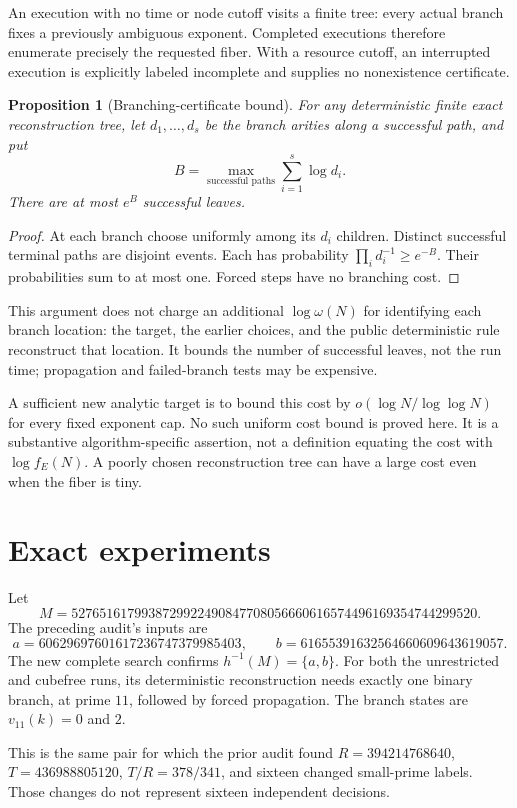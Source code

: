 \documentclass[11pt]{article}
\newtheorem{proposition}[theorem]{Proposition}
\begin{document}
An execution with no time or node cutoff visits a finite tree: every actual branch fixes a previously ambiguous exponent. Completed executions therefore enumerate precisely the requested fiber. With a resource cutoff, an interrupted execution is explicitly labeled incomplete and supplies no nonexistence certificate.

\begin{proposition}[Branching-certificate bound]\label{prop:cost}
For any deterministic finite exact reconstruction tree, let $d_1,\ldots,d_s$ be the branch arities along a successful path, and put
\[
 B=\max_{\text{successful paths}}\sum_{i=1}^s\log d_i.
\]
There are at most $e^B$ successful leaves.
\end{proposition}
\begin{proof}
At each branch choose uniformly among its $d_i$ children. Distinct successful terminal paths are disjoint events. Each has probability $\prod_i d_i^{-1}\ge e^{-B}$. Their probabilities sum to at most one. Forced steps have no branching cost.
\end{proof}

This argument does not charge an additional $\log\omega(N)$ for identifying each branch location: the target, the earlier choices, and the public deterministic rule reconstruct that location. It bounds the number of successful leaves, not the run time; propagation and failed-branch tests may be expensive.

A sufficient new analytic target is to bound this cost by $o(\log N/\log\log N)$ for every fixed exponent cap. No such uniform cost bound is proved here. It is a substantive algorithm-specific assertion, not a definition equating the cost with $\log f_E(N)$. A poorly chosen reconstruction tree can have a large cost even when the fiber is tiny.

\section{Exact experiments}\label{sec:experiments}
Let
\[
 M=5276516179938729922490847708056660616574496169354744299520.
\]
The preceding audit's inputs are
\[
 a=60629697601617236747379985403,\qquad
 b=61655391632564660609643619057.
\]
The new complete search confirms $h^{-1}(M)=\{a,b\}$. For both the unrestricted and cubefree runs, its deterministic reconstruction needs exactly one binary branch, at prime $11$, followed by forced propagation. The branch states are $v_{11}(k)=0$ and $2$.

This is the same pair for which the prior audit found $R=394214768640$, $T=436988805120$, $T/R=378/341$, and sixteen changed small-prime labels. Those changes do not represent sixteen independent decisions.
\end{document}

